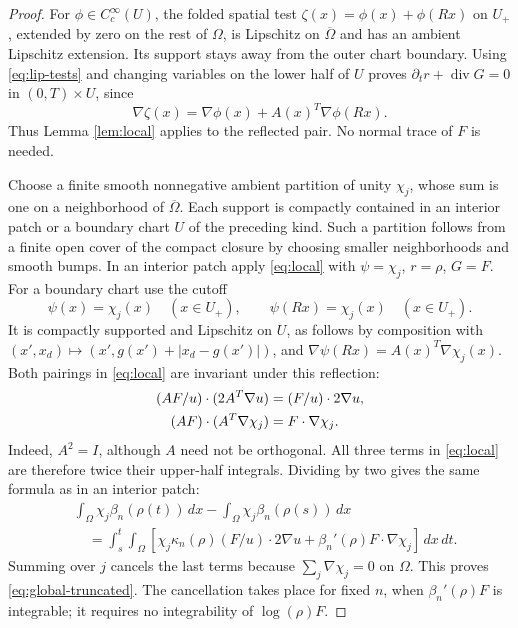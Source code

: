 \documentclass[11pt]{article}
\newcommand{\dd}{\,dx}
\newcommand{\dt}{\,dt}
\newcommand{\grad}{\nabla}
\newcommand{\Div}{\operatorname{div}}
\begin{document}
\begin{proof}
For $\phi\in C_c^\infty(U)$, the folded spatial test
$\zeta(x)=\phi(x)+\phi(Rx)$ on $U_+$, extended by zero on the rest of
$\Omega$, is Lipschitz on $\overline\Omega$ and has an ambient Lipschitz
extension. Its support stays away from the outer chart boundary.
Using \eqref{eq:lip-tests} and changing variables on the lower half of $U$
proves $\partial_t r+\Div G=0$ in $(0,T)\times U$, since
\[
 \grad\zeta(x)=\grad\phi(x)+A(x)^T\grad\phi(Rx).
\]
Thus Lemma \ref{lem:local} applies to the reflected pair. No normal trace
of $F$ is needed.

Choose a finite smooth nonnegative ambient partition of unity $\chi_j$,
whose sum is one on a neighborhood of $\overline\Omega$.
Each support is compactly contained in an interior patch or a boundary
chart $U$ of the preceding kind. Such a partition follows from a finite
open cover of the compact closure by choosing smaller neighborhoods and
smooth bumps. In an interior patch apply \eqref{eq:local} with
$\psi=\chi_j$, $r=\rho$, $G=F$. For a boundary chart use the cutoff
\[
 \psi(x)=\chi_j(x)\quad(x\in U_+),\qquad
 \psi(Rx)=\chi_j(x)\quad(x\in U_+).
\]
It is compactly supported and Lipschitz on $U$, as follows by composition
with $(x',x_d)\mapsto(x',g(x')+|x_d-g(x')|)$, and
$\grad\psi(Rx)=A(x)^T\grad\chi_j(x)$.
Both pairings in \eqref{eq:local} are invariant under this reflection:
\begin{align}\label{eq:invariance}
 (AF/u)\cdot(2A^T\grad u)&=(F/u)\cdot2\grad u,\notag\\
 (AF)\cdot(A^T\grad\chi_j)&=F\cdot\grad\chi_j.
\end{align}
Indeed, $A^2=I$, although $A$ need not be orthogonal.
All three terms in \eqref{eq:local} are therefore twice their upper-half
integrals. Dividing by two gives the same formula as in an interior patch:
\begin{align*}
 &\int_\Omega\chi_j\beta_n(\rho(t))\dd
          -\int_\Omega\chi_j\beta_n(\rho(s))\dd\\
 &\quad=\int_s^t\!\int_\Omega\left[
   \chi_j\kappa_n(\rho)(F/u)\cdot2\grad u
       +\beta_n'(\rho)F\cdot\grad\chi_j\right]\dd\dt.
\end{align*}
Summing over $j$ cancels the last terms because
$\sum_j\grad\chi_j=0$ on $\Omega$. This proves
\eqref{eq:global-truncated}. The cancellation takes place for fixed $n$,
when $\beta_n'(\rho)F$ is integrable; it requires no integrability of
$\log(\rho)F$.
\end{proof}
\end{document}
